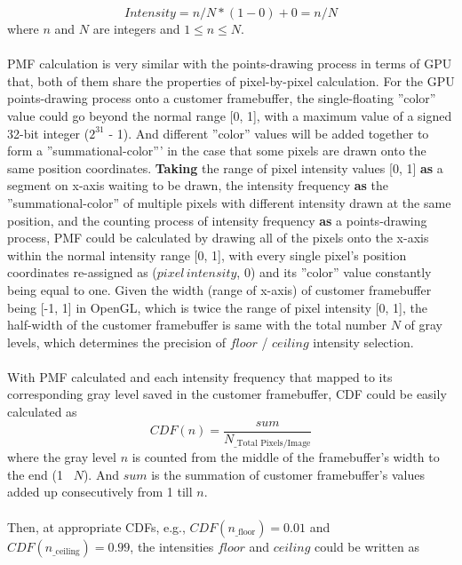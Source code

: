 \begin{equation}
%
Intensity = n/N * (1 - 0) + 0 = n/N
%
\end{equation}%
%
where \(n\) and \(N\) are integers and \(1 \leqslant n \leqslant N\).\\\\%
%
PMF calculation is very similar with the points-drawing process in terms of GPU that, both of them share the properties of pixel-by-pixel calculation. For the GPU points-drawing process onto a customer framebuffer, the single-floating ''color'' value could go beyond the normal range [0, 1], with a maximum value of a signed 32-bit integer (\(2^{31}\) - 1). And different ''color'' values will be added together to form a ''summational-color''' in the case that some pixels are drawn onto the same position coordinates. \textbf{Taking} the range of pixel intensity values [0, 1] \textbf{as} a segment on x-axis waiting to be drawn, the intensity frequency \textbf{as} the ''summational-color'' of multiple pixels with different intensity drawn at the same position, and the counting process of intensity frequency \textbf{as} a points-drawing process, PMF could be calculated by drawing all of the pixels onto the x-axis within the normal intensity range [0, 1], with every single pixel's position coordinates re-assigned as (\(pixel \, intensity\), \(0\)) and its ''color'' value constantly being equal to one. Given the width (range of x-axis) of customer framebuffer being [-1, 1] in OpenGL, which is twice the range of pixel intensity [0, 1], the half-width of the customer framebuffer is same with the total number \(N\) of gray levels, which determines the precision of \(floor\) / \(ceiling\) intensity selection. 
\\\\%
With PMF calculated and each intensity frequency that mapped to its corresponding gray level saved in the customer framebuffer, CDF could be easily calculated as
%
\begin{equation}
%
CDF(n) = \frac{sum}{N_{\text{\_Total Pixels/Image}}} 
%
\end{equation}%
%
where the gray level \(n\) is counted from the middle of the framebuffer's width to the end (1 \texttildelow \, \(N\)). And \(sum\) is the summation of customer framebuffer's values added up consecutively from 1 till \(n\).\\\\%
%
Then, at appropriate CDFs, e.g., \(CDF(n_{\text{\_floor}}) = 0.01\) and \(CDF(n_{\text{\_ceiling}}) = 0.99\), the intensities \(floor\) and \(ceiling\) could be written as
